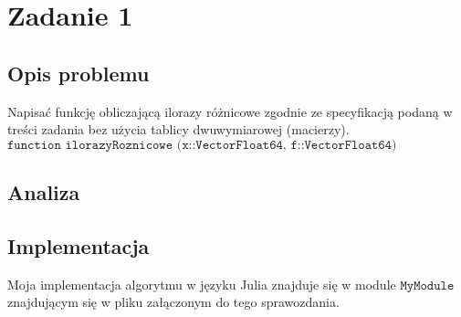 \section{Zadanie 1}
\subsection{Opis problemu}
Napisać funkcję obliczającą ilorazy różnicowe zgodnie ze specyfikacją podaną w treści zadania bez użycia tablicy dwuwymiarowej (macierzy). \\ $ \texttt{function ilorazyRoznicowe (x::Vector{Float64}, f::Vector{Float64})} $ \\
\subsection{Analiza}
\subsection{Implementacja}
Moja implementacja algorytmu w języku Julia znajduje się w module $ \texttt{MyModule} $ znajdującym się w pliku załączonym do tego sprawozdania. 